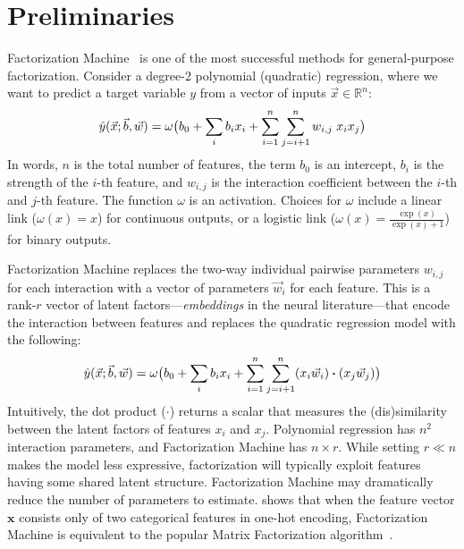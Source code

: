 \documentclass{article}
\newcommand{\vect}[1]{\vec{#1}}
\newcommand{\dotp}{\boldsymbol{\cdot} }
\begin{document}
\section{Preliminaries}
Factorization Machine~\cite{rendle2010factorization} is one of the most successful methods for  general-purpose factorization.
Consider a degree-2 polynomial (quadratic) regression, where we want to predict a target variable $y$  from a  vector of inputs $\vect{x} \in \mathbb{R}^n$:
\begin{equation}
\hat y(\vect{x}; \vect{b}, \vect{w})= \omega \bigl(%
    \vphantom{\sum_j} b_0  +
    \sum_i b_i x_i  +
     \sum_{i=1}^n \sum_{j=i+1}^n  w_{i,j}   \;  x_i  x_j
\bigr)
\label{eq:polynomial}
\end{equation}
In words, $n$ is the total number of features, the  term  $b_0$ is an intercept,   $b_i$ is the strength of the $i$-th feature, and $w_{i,j}$  is  the interaction coefficient between the $i$-th and  $j$-th feature.
The function $\omega$ is an activation.
Choices for  $\omega$ include a linear  link ($\omega(x) = x$) for continuous outputs, or a logistic link ($
\omega(x) = \frac{\exp(x)}{\exp(x) +1}$)
for binary outputs.



Factorization Machine replaces the two-way individual  pairwise parameters $w_{i,j}$ for each interaction with a vector of parameters
$\vect{w}_i$ for each feature. This is a rank-$r$ vector of latent factors---\textit{embeddings} in the neural  literature---that encode the interaction between features and replaces the quadratic regression model with the following:
\begin{equation}
\hat y(\vect{x}; \vect{b}, \vect{w})= \omega \bigl(%
    \vphantom{\sum_j} b_0  +
    \sum_i b_i x_i  +
     \sum_{i=1}^n \sum_{j=i+1}^n   (x_i \vect{w}_{i}) \dotp  (x_j \vect{w}_{j})
\bigr)
\label{eq:FM}
\end{equation}
Intuitively, the dot product ($\dotp$) returns a scalar that measures the (dis)similarity between the latent factors of features $x_i$ and $x_j$.
Polynomial regression has $n^2$  interaction parameters, and Factorization Machine has $n \times r$.
While  setting $r \ll n$  makes the model less expressive, factorization will typically exploit features having some shared latent structure.
 Factorization Machine may dramatically reduce the number of parameters to estimate.
\citet{rendle2010factorization} shows that when the feature vector $\mathbf{x}$ consists only of  two categorical features in one-hot encoding, %
Factorization Machine is equivalent to the popular Matrix Factorization algorithm~\cite{koren_matrixfactorization}.
\end{document}
